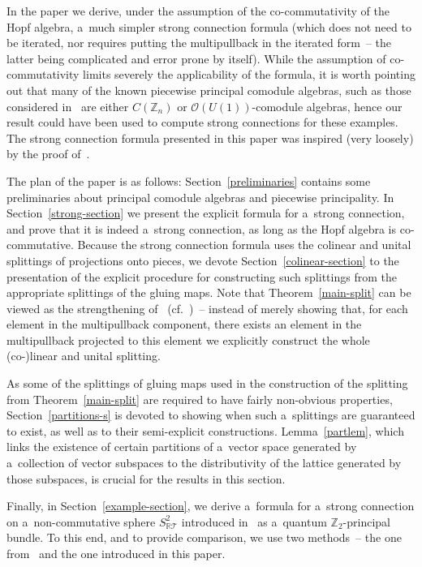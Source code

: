 \documentclass[pdftex]{sigma}
\begin{document}
In the paper we derive, under the assumption of the co-commutativity of the Hopf algebra, a~much simpler strong
connection formula (which does not need to be iterated, nor requires putting the multipullback in the iterated form~--
the latter being complicated and error prone by itself).
While the assumption of co-commutativity limits severely the applicability of the formula, it is worth pointing out that
many of the known piecewise principal comodule algebras, such as those considered in~\cite{bhms,hms2,hms,Rennie,
haj-wagn,reduct} are either $C({\mathbb Z}_n)$ or $\mathcal{O}(U(1))$-comodule algebras, hence our result
could have been used to compute strong connections for these examples.
The strong connection formula presented in this paper was inspired (very loosely) by the proof
of~\cite[Theorem~3.3.2]{rudnikphd}.

The plan of the paper is as follows: Section~\ref{preliminaries} contains some preliminaries about principal comodule
algebras and piecewise principality.
In Section~\ref{strong-section} we present the explicit formula for a~strong connection, and prove that it is indeed
a~strong connection, as long as the Hopf algebra is co-commutative.
Because the strong connection formula uses the colinear and unital splittings of projections onto pieces, we devote
Section~\ref{colinear-section} to the presentation of the explicit procedure for constructing such splittings from the
appropriate splittings of the gluing maps.
Note that Theorem~\ref{main-split} can be viewed as the strengthening of~\cite[Proposition~9]{CM2000}
(cf.~\cite[Theorem~7]{cocycle})~-- instead of merely showing that, for each element in the multipullback component,
there exists an element in the multipullback projected to this element we explicitly construct the whole (co-)linear and
unital splitting.

As some of the splittings of gluing maps used in the construction of the splitting from Theo\-rem~\ref{main-split} are
required to have fairly non-obvious properties,  Section~\ref{partitions-s} is devoted to showing when such
a~splittings are guaranteed to exist, as well as to their semi-explicit constructions.
Lemma~\ref{partlem}, which links the existence of certain partitions of a~vector space generated by a~collection of
vector subspaces to the distributivity of the lattice generated by those subspaces, is crucial for the results in this
section.

Finally, in Section~\ref{example-section}, we derive a~formula for a~strong connection on a~non-commutative sphere
$S^2_{\mathbb{R}\mathcal{T}}$ introduced in~\cite{reduct} as a~quantum ${\mathbb Z_2}$-principal bundle.
To this end, and to provide comparison, we use two methods~-- the one from~\cite{hkmz11} and the one introduced in this
paper.
\end{document}
